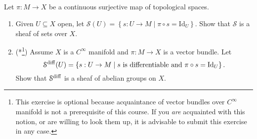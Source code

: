 \documentclass[11pt, reqno,a4paper, twoside]{amsproc}
\newcommand{\id}{\mathrm{Id}}
\newcommand{\set}[1]{\left\{{#1}\right\}}
\newcommand{\mcal}{\mathcal}
\begin{document}
\subsection{} Let $\pi:M\to X$ be a continuous surjective map of topological spaces. 
\begin{enumerate}
	\item Given $U\subseteq X$ open, let $\mcal{S}(U)=\set{s:U\to M\mid \pi\circ s=\id_U}$. Show that $\mcal{S}$ is a sheaf of sets over $X$. 
	\item (*\footnote{This exercise is optional because acquaintance of vector bundles over $C^\infty$ manifold is not a prerequisite of this course. If you \textit{are} acquainted with this notion, or are willing to look them up, it is advisable to submit this exercise in any case.}) Assume $X$ is a $C^\infty$ manifold and $\pi:M\to X$ is a vector bundle. Let \[\mcal{S}^{\rm diff}(U)=\set{s:U\to M\mid s\text{ is differentiable and }\pi\circ s=\id_U}.\]
	Show that $\mcal{S}^{\rm diff}$ is a sheaf of abelian groups on $X$. 
\end{enumerate}
\end{document}
